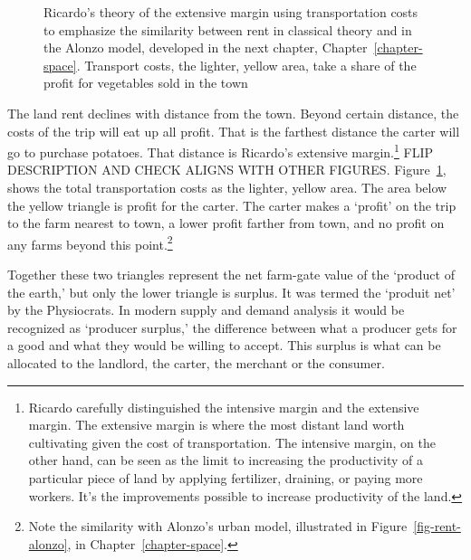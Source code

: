\begin{figure}[htb]
\begin{center}
    
\caption[Ricardo's theory of extensive margin.]{Ricardo's theory of the extensive margin using transportation costs to emphasize the similarity between rent in classical theory and in the Alonzo model, developed in the next chapter, Chapter~\ref{chapter-space}. Transport costs, the lighter, yellow area, take a share of the profit for vegetables sold in the town}
\label{fig-rent-ricardo}
\end{center}
\end{figure}

The land rent declines with distance from the town. Beyond certain distance, the costs of the trip will eat up all profit. That is the farthest distance the carter will go to purchase potatoes. That distance is Ricardo's \gls{extensive margin}.\footnote{Ricardo carefully distinguished the \gls{intensive margin} and the \gls{extensive margin}. The extensive margin is where the most distant land worth cultivating given the cost of transportation. The intensive margin, on the other hand, can be seen as the limit to increasing the productivity of a particular piece of land by applying fertilizer, draining, or paying more workers. It's the improvements possible to increase productivity of the land.} %
FLIP DESCRIPTION AND CHECK ALIGNS WITH OTHER FIGURES. Figure~\ref{fig-rent-ricardo}, shows the total transportation costs as the lighter, yellow area. The area below the yellow triangle is profit for the carter. The carter makes a `profit' on the trip to the farm nearest to town, a lower profit farther from town, and no profit on any farms beyond this point.\footnote{Note the similarity with Alonzo's urban model, illustrated in Figure~\ref{fig-rent-alonzo}, in Chapter~\ref{chapter-space}.} 

Together these two triangles represent the net farm-gate value of the `product of the earth,' but only the lower triangle is \gls{surplus}. It was termed the `produit net' by the Physiocrats. In modern supply and demand analysis it would be recognized as `producer surplus,' the difference between what a producer gets for a good and what they would be willing to accept. This surplus is what can be allocated to the landlord, the carter, the merchant or the consumer. 

